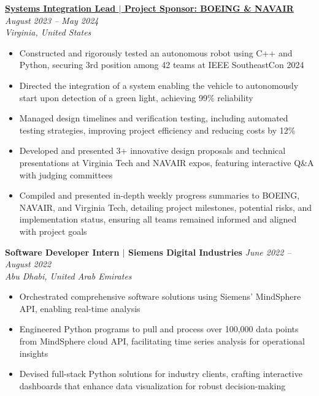 \documentclass[letterpaper,11pt]{article}
\begin{document}
  \item \textbf{\href{https://www.youtube.com/watch?v=jMc0rQBXLdU}{Systems Integration Lead $|$ Project Sponsor: BOEING \& NAVAIR}} \hfill \textit{\small August 2023 -- May 2024} \\
  \small \textit{Virginia, United States} \vspace{-0.1\baselineskip}  %
  \begin{itemize}[leftmargin=5mm, itemsep=0pt, topsep=0pt]  %
    \item \small Constructed and rigorously tested an autonomous robot using C++ and Python, securing 3rd position among 42 teams at IEEE SoutheastCon 2024
    \item \small Directed the integration of a system enabling the vehicle to autonomously start upon detection of a green light, achieving 99\% reliability
    \item \small Managed design timelines and verification testing, including automated testing strategies, improving project efficiency and reducing costs by 12\%
    \item \small Developed and presented 3+ innovative design proposals and technical presentations at Virginia Tech and NAVAIR expos, featuring interactive Q\&A with judging committees
    \item \small Compiled and presented in-depth weekly progress summaries to BOEING, NAVAIR, and Virginia Tech, detailing project milestones, potential risks, and implementation status, ensuring all teams remained informed and aligned with project goals
  \end{itemize}

  \item \textbf{Software Developer Intern $|$ Siemens Digital Industries} \hfill \textit{\small June 2022 -- August 2022} \\
  \small \textit{Abu Dhabi, United Arab Emirates} \vspace{-0.15\baselineskip} %
  \begin{itemize}[leftmargin=5mm, itemsep=0pt, topsep=0pt] %
    \item \small Orchestrated comprehensive software solutions using Siemens' MindSphere API, enabling real-time analysis
    \item \small Engineered Python programs to pull and process over 100,000 data points from MindSphere cloud API, facilitating time series analysis for operational insights
    \item \small Devised full-stack Python solutions for industry clients, crafting interactive dashboards that enhance data visualization for robust decision-making
  \end{itemize}
\end{document}
